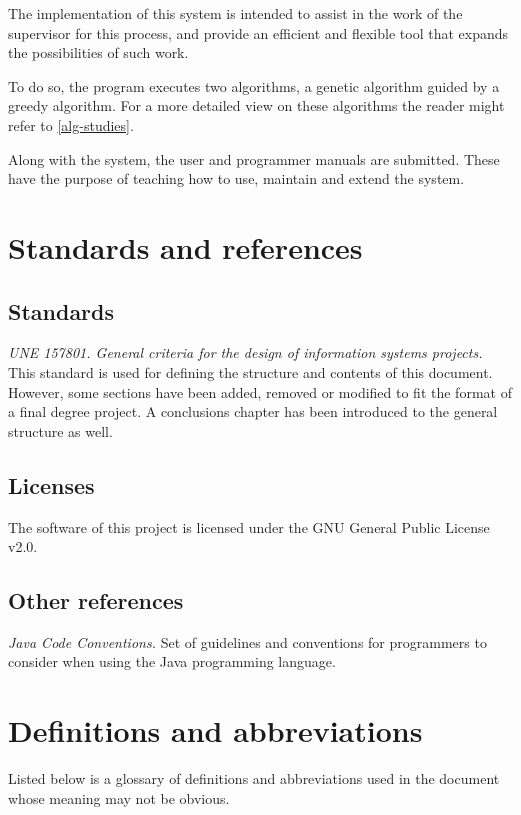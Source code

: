The implementation of this system is intended to assist in the work of the supervisor for this process, and provide an efficient and flexible tool that expands the possibilities of such work.

To do so, the program executes two algorithms, a genetic algorithm guided by a greedy algorithm. For a more detailed view on these algorithms the reader might refer to \ref{alg-studies}.

Along with the system, the user and programmer manuals are submitted. These have the purpose of teaching how to use, maintain and extend the system.

\section{Standards and references}

\subsection{Standards}

\textit{UNE 157801. General criteria for the design of information systems projects.} This standard is used for defining the structure and contents of this document. However, some sections have been added, removed or modified to fit the format of a final degree project. A conclusions chapter has been introduced to the general structure as well.

\subsection{Licenses}

The software of this project is licensed under the GNU General Public License v2.0.

\subsection{Other references}

\textit{Java Code Conventions.} Set of guidelines and conventions for programmers to consider when using the Java programming language.

\section{Definitions and abbreviations}

Listed below is a glossary of definitions and abbreviations used in the document whose meaning may not be obvious.

